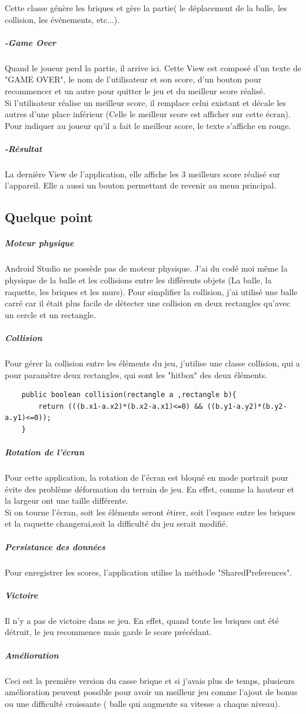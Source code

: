 \documentclass[a4paper]{article}
\begin{document}
Cette classe génère les briques et gère la partie( le déplacement de la balle, les collision, les événements, etc...).

\subparagraph{-Game Over} Quand le joueur perd la partie, il arrive ici. Cette View est composé d'un texte de "GAME OVER", le nom de l'utilisateur et son score, d'un bouton pour recommencer et un autre pour quitter le jeu et du meilleur score réalisé. \\
Si l'utilisateur réalise un meilleur score, il remplace celui existant et décale les autres d'une place inférieur (Celle le meilleur score est afficher sur cette écran). Pour indiquer au joueur qu'il a fait le meilleur score, le texte s'affiche en rouge.
\pagebreak

\subparagraph{-Résultat} La dernière View de l'application, elle affiche les 3 meilleurs score réalisé sur l'appareil. Elle a aussi un bouton permettant de revenir au menu principal.


\subsection{Quelque point}
\subparagraph{Moteur physique} Android Studio ne possède pas de moteur physique. J'ai du codé moi même la physique de la balle et les collisions entre les différents objets (La balle, la raquette, les briques et les murs). Pour simplifier la collision, j'ai utilisé une balle carré car il était plus facile de détecter une collision en deux rectangles qu'avec un cercle et un rectangle.
\subparagraph{Collision} Pour gérer la collision entre les éléments du jeu, j'utilise une classe collision, qui a pour paramètre deux rectangles, qui sont les "hitbox" des deux éléments.
\begin{lstlisting}
    public boolean collision(rectangle a ,rectangle b){
        return (((b.x1-a.x2)*(b.x2-a.x1)<=0) && ((b.y1-a.y2)*(b.y2-a.y1)<=0));
    }
\end{lstlisting}
\subparagraph{Rotation de l'écran} Pour cette application, la rotation de l'écran est bloqué en mode portrait pour évite des problème déformation du terrain de jeu. En effet, comme la hauteur et la largeur ont une taille différente.\\ Si on tourne l'écran, soit les éléments seront étirer, soit l'espace entre les briques et la raquette changerai,soit la difficulté du jeu serait modifié.
\subparagraph{Persistance des données} Pour enregistrer les scores, l'application utilise la méthode "SharedPreferences".
\subparagraph{Victoire}Il n'y a pas de victoire dans se jeu. En effet, quand toute les briques ont été détruit, le jeu recommence mais garde le score précédant.
\subparagraph{Amélioration}Ceci est la première version du casse brique et si j'avais plus de temps, plusieurs amélioration peuvent possible pour avoir un meilleur jeu comme l'ajout de bonus ou une difficulté croissante ( balle qui augmente sa vitesse a chaque niveau).
\end{document}

